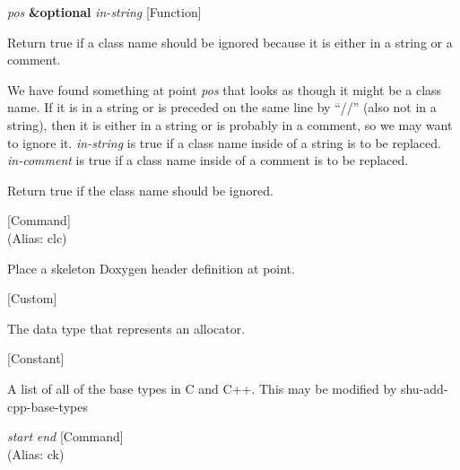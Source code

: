 \vspace{1em}
\noindent
{}
\usebox{\funcname}\emph{pos} \textbf{\&optional} \emph{in-string}
 \hfill [Function]
\hspace*{\wd\funcname}

\begin{doc-string}
Return true if a class name should be ignored because it is either in a
string or a comment.

We have found something at point \emph{pos} that looks as though it might be a class
name.  If it is in a string or is preceded on the same line by ``//'' (also not
in a string), then it is either in a string or is probably in a comment, so we
may want to ignore it.  \emph{in-string} is true if a class name inside of a string is
to be replaced.  \emph{in-comment} is true if a class name inside of a comment is to be
replaced.

Return true if the class name should be ignored.
\end{doc-string}

\vspace{1em}
\noindent
{}
\usebox{\funcname}
 \hfill [Command]\\%
 (Alias: clc)

\begin{doc-string}
Place a skeleton Doxygen header definition at point.
\end{doc-string}

\vspace{1em}
\noindent
{}
\usebox{\funcname}
 \hfill [Custom]

\begin{doc-string}
The data type that represents an allocator.
\end{doc-string}

\vspace{1em}
\noindent
{}
\usebox{\funcname}
 \hfill [Constant]

\begin{doc-string}
A list of all of the base types in C and C++.  This may be modified by shu-add-cpp-base-types
\end{doc-string}

\vspace{1em}
\noindent
{}
\usebox{\funcname}\emph{start} \emph{end}
 \hfill [Command]\\%
 (Alias: ck)

